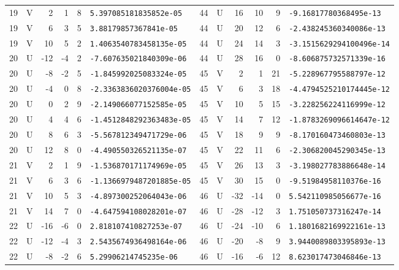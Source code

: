 \begin{longtable}{rcrrrl|rcrrrl}
19 & V & 2 & 1 & 8 & \texttt{5.397085181835852e-05} & 44 & U & 16 & 10 & 9 & \texttt{-9.16817780368495e-13}\\
19 & V & 6 & 3 & 5 & \texttt{3.88179857367841e-05} & 44 & U & 20 & 12 & 6 & \texttt{-2.438245360340086e-13}\\
19 & V & 10 & 5 & 2 & \texttt{1.4063540783458135e-05} & 44 & U & 24 & 14 & 3 & \texttt{-3.1515629294100496e-14}\\
20 & U & -12 & -4 & 2 & \texttt{-7.607635021840309e-06} & 44 & U & 28 & 16 & 0 & \texttt{-8.606875732571339e-16}\\
20 & U & -8 & -2 & 5 & \texttt{-1.845992025083324e-05} & 45 & V & 2 & 1 & 21 & \texttt{-5.228967795588797e-12}\\
20 & U & -4 & 0 & 8 & \texttt{-2.3363836020376004e-05} & 45 & V & 6 & 3 & 18 & \texttt{-4.4794525210174445e-12}\\
20 & U & 0 & 2 & 9 & \texttt{-2.149066077152585e-05} & 45 & V & 10 & 5 & 15 & \texttt{-3.228256224116999e-12}\\
20 & U & 4 & 4 & 6 & \texttt{-1.4512848292363483e-05} & 45 & V & 14 & 7 & 12 & \texttt{-1.8783269096614647e-12}\\
20 & U & 8 & 6 & 3 & \texttt{-5.567812349471729e-06} & 45 & V & 18 & 9 & 9 & \texttt{-8.170160473460803e-13}\\
20 & U & 12 & 8 & 0 & \texttt{-4.490550326521135e-07} & 45 & V & 22 & 11 & 6 & \texttt{-2.306820045290345e-13}\\
21 & V & 2 & 1 & 9 & \texttt{-1.536870171174969e-05} & 45 & V & 26 & 13 & 3 & \texttt{-3.198027783886648e-14}\\
21 & V & 6 & 3 & 6 & \texttt{-1.1366979487201885e-05} & 45 & V & 30 & 15 & 0 & \texttt{-9.51984958110376e-16}\\
21 & V & 10 & 5 & 3 & \texttt{-4.897300252064043e-06} & 46 & U & -32 & -14 & 0 & \texttt{5.542110985056677e-16}\\
21 & V & 14 & 7 & 0 & \texttt{-4.647594108028201e-07} & 46 & U & -28 & -12 & 3 & \texttt{1.751050737316247e-14}\\
22 & U & -16 & -6 & 0 & \texttt{2.818107410827253e-07} & 46 & U & -24 & -10 & 6 & \texttt{1.1801682169922161e-13}\\
22 & U & -12 & -4 & 3 & \texttt{2.5435674936498164e-06} & 46 & U & -20 & -8 & 9 & \texttt{3.9440089803395893e-13}\\
22 & U & -8 & -2 & 6 & \texttt{5.29906214745235e-06} & 46 & U & -16 & -6 & 12 & \texttt{8.623017473046846e-13}\\

\end{longtable}
